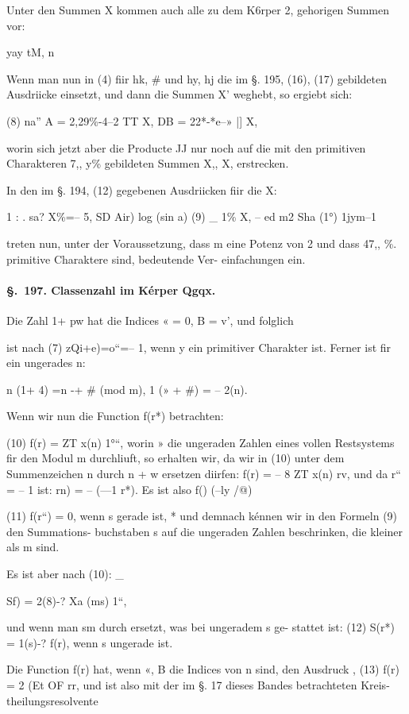 \documentclass[12pt,a4paper]{article}
\theoremstyle{plain}
\theoremstyle{definition}
\begin{document}
Unter den Summen X kommen auch alle zu dem K6rper 2, gehorigen Summen vor:

yay tM, n

Wenn man nun in (4) fiir hk, \# und hy, hj die im §. 195, (16), (17) gebildeten Ausdriicke einsetzt, und dann die Summen X' weghebt, so ergiebt sich:

(8) na'' A = 2,29\%-4--2 TT X, DB = 22*-*e--» |] X,

worin sich jetzt aber die Producte JJ nur noch auf die mit den primitiven Charakteren 7,, y\% gebildeten Summen X,, X, erstrecken.

In den im §. 194, (12) gegebenen Ausdriicken fiir die X:

1 : . sa? X\%=-- 5, SD Air) log (sin a) (9) \_ 1\% X, -- ed m2 Sha (1°) 1jym--1

treten nun, unter der Voraussetzung, dass m eine Potenz von 2 und dass 47,, \%. primitive Charaktere sind, bedeutende Ver- einfachungen ein.

\paragraph{\S.~197. Classenzahl im Kérper Qgqx.}


Die Zahl 1+ pw hat die Indices « = 0, B = v', und folglich

ist nach (7) zQi+e)=o``=-- 1, wenn y ein primitiver Charakter ist. Ferner ist fir ein ungerades n:

n (1+ 4) =n -+ \# (mod m), 1 (» + \#) = -- 2(n).

Wenn wir nun die Function f(r*) betrachten:

(10) f(r) = ZT x(n) 1°``, worin » die ungeraden Zahlen eines vollen Restsystems fir den Modul m durchliuft, so erhalten wir, da wir in (10) unter dem Summenzeichen n durch n + w ersetzen diirfen: f(r) = -- 8 ZT x(n) rv, und da r`` = -- 1 ist: rn) = -- (---1 r*). Es ist also f() (--ly /@)

(11) f(r``) = 0, wenn s gerade ist, * und demnach kénnen wir in den Formeln (9) den Summations- buchstaben s auf die ungeraden Zahlen beschrinken, die kleiner als m sind.

Es ist aber nach (10): \_

Sf) = 2(8)-? Xa (ms) 1``,

und wenn man sm durch  ersetzt, was bei ungeradem s ge- stattet ist: (12) S(r*) = 1(s)-? f(r), wenn s ungerade ist.

Die Function f(r) hat, wenn «, B die Indices von n sind, den Ausdruck , (13) f(r) = 2 (Et OF rr, und ist also mit der im §. 17 dieses Bandes betrachteten Kreis- theilungsresolvente
\end{document}
